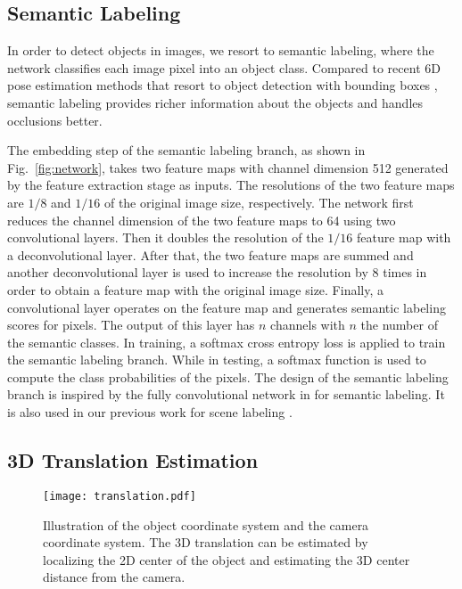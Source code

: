 \documentclass[conference]{IEEEtran}
\begin{document}
\subsection{Semantic Labeling}

In order to detect objects in images, we resort to semantic labeling, where the network classifies each image pixel into an object class. Compared to recent 6D pose estimation methods that resort to object detection with bounding boxes \cite{rad2017bb8,kehl2017ssd,tekin2017real}, semantic labeling provides richer information about the objects and handles occlusions better.

The embedding step of the semantic labeling branch, as shown in Fig.~\ref{fig:network}, takes two feature maps with channel dimension 512 generated by the feature extraction stage as inputs. The resolutions of the two feature maps are $1/8$ and $1/16$ of the original image size, respectively. The network first reduces the channel dimension of the two feature maps to 64 using two convolutional layers. Then it doubles the resolution of the $1/16$ feature map with a deconvolutional layer. After that, the two feature maps are summed and another deconvolutional layer is used to increase the resolution by 8 times in order to obtain a feature map with the original image size. Finally, a convolutional layer operates on the feature map and generates semantic labeling scores for pixels. The output of this layer has $n$ channels with $n$ the number of the semantic classes. In training, a softmax cross entropy loss is applied to train the semantic labeling branch. While in testing, a softmax function is used to compute the class probabilities of the pixels. The design of the semantic labeling branch is inspired by the fully convolutional network in \cite{long2015fully} for semantic labeling. It is also used in our previous work for scene labeling \cite{xiang2017darnn}.


\subsection{3D Translation Estimation}

\begin{figure}
	\centering
	\texttt{[image: translation.pdf]}
	\caption{Illustration of the object coordinate system and the camera coordinate system. The 3D translation can be estimated by localizing the 2D center of the object and estimating the 3D center distance from the camera.}
	\label{fig:translation}
	\vspace{-6mm}
\end{figure}
\end{document}
